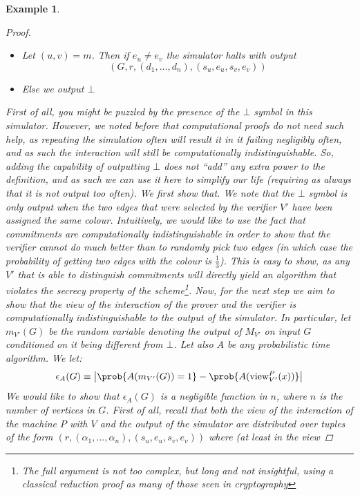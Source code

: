 \documentclass{article}
\newtheorem{example}{Example}
\begin{document}
\begin{example}
\begin{proof}
\begin{itemize}
            \item Let $(u, v) = m$. Then if $e_u \neq e_v$ the simulator halts with output \[(G, r, (d_1, \dots, d_n), (s_u, e_u, s_v, e_v))\]
            \item Else we output $\bot$
        \end{itemize}
        First of all, you might be puzzled by the presence of the $\bot$ symbol in this simulator.
        However, we noted before that computational proofs do not need such help, as repeating the simulation often
        will result it in it failing negligibly often, and as such the interaction will still be computationally indistinguishable.
        So, adding the capability of outputting $\bot$ does not \enquote{add} any extra power to the definition, and as such we
        can use it here to simplify our life (requiring as always that it is not output too often).
        We first show that. We note that the $\bot$ symbol is only output when
        the two edges that were selected by the verifier $V'$ have been assigned the same colour.
        Intuitively, we would like to use the fact that commitments are computationally indistinguishable
        in order to show that the verifier cannot do much better than to randomly pick two edges (in which
        case the probability of getting two edges with the colour is $\frac{1}{3}$). This is easy to show,
        as any $V'$ that is able to distinguish commitments will directly yield an algorithm that violates
        the secrecy property of the scheme\footnote{The full argument is not too complex, but long and not
            insightful, using a classical reduction proof as many of those seen in cryptography}.
        Now, for the next step we aim to show that the view of the interaction of the prover and the verifier is
        computationally indistinguishable to the output of the simulator. In particular, let $m_{V'}(G)$ be the
        random variable denoting the output of $M_{V'}$ on input $G$ conditioned on it being different from $\bot$.
        Let also $A$ be any probabilistic time algorithm.
        We let:
        \[ \epsilon_A(G) \equiv \left| \prob{A(m_{V'}(G)) = 1} - \prob{A(\text{view}^{P}_{V'}(x))} \right| \]
        We would like to show that $\epsilon_A(G)$ is a negligible function in $n$, where $n$ is the number
        of vertices in $G$. First of all, recall that both the view of the interaction of the machine $P$ with $V$
        and the output of the simulator are distributed over tuples of the form $(r, (\alpha_1, \dots , \alpha_n), (s_u, e_u, s_v, e_v))$ where (at least in the view

\end{proof}
\end{example}
\end{document}
